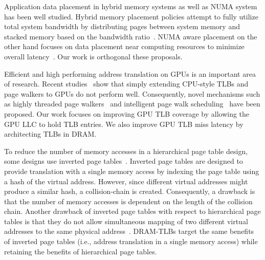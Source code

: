  Application data
placement in hybrid memory systems as well as NUMA system has been
well studied. Hybrid memory placement policies attempt to fully
utilize total system bandwidth by distributing pages between system
memory and stacked memory based on the bandwidth
ratio~\cite{bwa,batman}. NUMA aware placement on the other hand
focuses on data placement near computing resources to minimize overall
latency~\cite{numa-traffic, numa-OSsupport, numa-bolosky}. Our work is
orthogonal these proposals.

 Efficient and
high performing address translation on GPUs is an important area of
research. Recent studies~\cite{power2014supporting, pichaigpu} show
that simply extending CPU-style TLBs and page walkers to GPUs do not
perform well. Consequently, novel mechanisms such as highly threaded
page walkers~\cite{power2014supporting} and intelligent page walk
scheduling~\cite{pichaigpu} have been proposed. Our work focuses on
improving GPU TLB coverage by allowing the GPU LLC to hold TLB
entries. We also improve GPU TLB miss latency by architecting TLBs in
DRAM.

 To reduce the number of memory
accesses in a hierarchical page table design, some designs use
inverted page tables~\cite{invertedPT,invertedPT2}. Inverted page
tables are designed to provide translation with a single memory access
by indexing the page table using a hash of the virtual address.
However, since different virtual addresses might produce a similar
hash, a collision-chain is created. Consequently, a drawback is that
the number of memory accesses is dependent on the length of the
collision chain. Another drawback of inverted page tables with respect
to hierarchical page tables is that they do not allow simultaneous
mapping of two different virtual addresses to the same physical
address~\cite{invertedPT}. DRAM-TLBs target the same benefits of
inverted page tables (i.e., address translation in a single memory
access) while retaining the benefits of hierarchical page tables.



